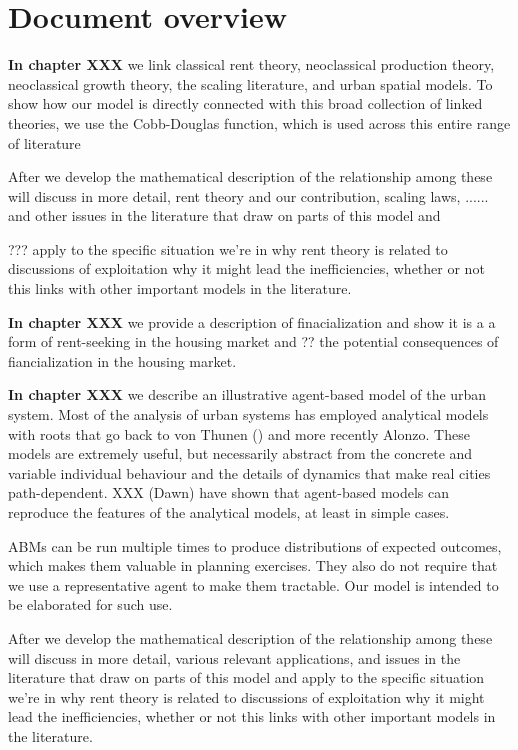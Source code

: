 \section{Document overview}

\textbf{In chapter XXX}  we link classical rent theory, neoclassical production theory, neoclassical growth theory, the scaling literature, and urban spatial models.
To show how our model is directly connected with this broad collection of linked theories, we use the Cobb-Douglas function, which is used across this entire range of literature 

After we develop the mathematical description of the relationship among these will discuss  in more detail, rent theory and our contribution, scaling laws, ......  and other issues in the literature that draw on parts of this model and 

???  apply to the specific situation we're in why rent theory is related to discussions of exploitation why it might lead the inefficiencies, whether or not this links with other important models in the literature.

\textbf{In chapter XXX} we  provide a description of finacialization and show it is a a form of rent-seeking in the housing market and ?? the potential consequences of fiancialization in the housing market. 



\textbf{In chapter XXX} we  describe an illustrative agent-based model of the urban system. Most of the analysis of urban systems has employed analytical models with roots that go back to von Thunen () and more recently Alonzo. These models are extremely useful, but necessarily abstract from the concrete  and variable individual behaviour and  the details  of dynamics that make real cities path-dependent. XXX (Dawn) have shown that agent-based models can reproduce the features of the analytical models, at least in simple cases. 

ABMs can be run multiple times to produce distributions of expected outcomes, which makes them valuable in planning exercises. They also do not require  that we use a representative agent to make them tractable. Our model is intended to be elaborated  for such use. 

After we develop the mathematical description of the relationship among these will discuss in more detail, various relevant applications, and issues in the literature that draw on parts of this model and apply to the specific situation we're in why rent theory is related to discussions of exploitation why it might lead the inefficiencies, whether or not this links with other important models in the literature.


